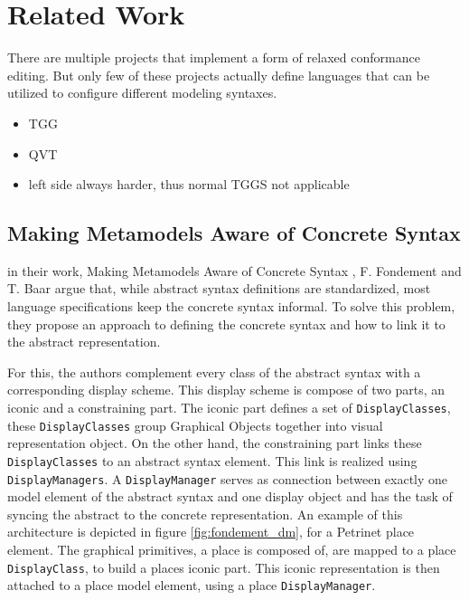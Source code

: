 \chapter{Related Work}
\label{chap:related_work}
There are multiple projects that implement a form of relaxed conformance editing. But only few of these projects actually define languages that can be utilized to configure different modeling syntaxes. 


\begin{itemize}
  \item TGG
  \item QVT
  \item left side always harder, thus normal TGGS not applicable
\end{itemize}





\section{Making Metamodels Aware of Concrete Syntax}
\label{sec:fondement}
in their work, Making Metamodels Aware of Concrete Syntax \cite{fondement_making_2005}, F. Fondement and T. Baar argue that, while abstract syntax definitions are standardized, most language specifications keep the concrete syntax informal. To solve this problem, they propose an approach to defining the concrete syntax and how to link it to the abstract representation.

For this, the authors complement every class of the abstract syntax with a corresponding display scheme. This display scheme is compose of two parts, an iconic and a constraining part. The iconic part defines a set of \texttt{DisplayClasses}, these \texttt{DisplayClasses} group Graphical Objects together into visual representation object. On the other hand, the constraining part links these \texttt{DisplayClasses} to an abstract syntax element. This link is realized using \texttt{DisplayManagers}. A \texttt{DisplayManager} serves as connection between exactly one model element of the abstract syntax and one display object and has the task of syncing the abstract to the concrete representation. An example of this architecture is depicted in figure \ref{fig:fondement_dm}, for a Petrinet place element. The graphical primitives, a place is composed of, are mapped to a place \texttt{DisplayClass}, to build a places iconic part. This iconic representation is then attached to a place model element, using a place \texttt{DisplayManager}.


